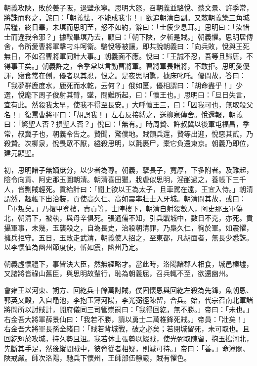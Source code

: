 \begin{pinyinscope}
 朝義攻陜，敗於姜子阪，退壁永寧。思明大怒，召朝義並駱悅、蔡文景、許季常，將誅而釋之，詫曰：「朝義怯，不能成我事！」欲追朝清自副。又敕朝義築三角城居糧，終日畢，未塓而思明至，怒不如約，辭曰：「士疲少息耳。」思明曰：「汝惜士而違我令邪？」據鞍畢塓乃去，顧曰：「朝下陜，夕斬是賊。」朝義懼。思明居傳舍，令所愛曹將軍擊刁斗呵衛。駱悅等被讓，即共說朝義曰：「向兵敗，悅與王死無日，不如召曹將軍同計大事。」朝義面不應。悅曰：「王誠不忍，吾等且歸唐，不得事王矣。」朝義許之，令季常以言動曹將軍。曹將軍畏諸將，不敢拒。思明愛優諢，寢食常在側，優者以其忍，恨之。是夜思明驚，據床叱吒。優問故，答曰：「我夢群鹿度水，鹿死而水乾，云何？」俄如匽，優相謂曰：「胡命盡乎！」少選，悅麾下周子俊射其臂，墜，問難所起，曰：「懷王也。」思明曰：「旦日失言，宜有此。然殺我太早，使我不得至長安。」大呼懷王三，曰：「囚我可也，無取殺父名！」復罵曹將軍曰：「胡誤我！」左右反接縛之，送柳泉傳舍。悅還報，朝義曰：「驚聖人否？損聖人否？」悅曰：「無有。」時周贄、許叔冀以後軍屯福昌，季常，叔冀子也，朝義令告之。贄聞，驚僕地。賊領兵還，贄等出迎，悅惡其貳，乃殺贄。次柳泉，悅畏眾不厭，縊殺思明，以氈裹尸，橐它負還東京。朝義乃即位，建元顯聖。



 初，思明諸子無嫡庶分，以少者為尊。朝義，孽長子，寬厚，下多附者。及難起，陰令向貢、阿史那玉圖朝清。朝清喜田獵，戕虐似思明，淫酗過之，養帳下三千人，皆剽賊輕死。貢紿計曰：「聞上欲以王為太子，且車駕在遠，王宜入侍。」朝清謂然，趣帳下出治裝，貢使高久仁、高如震率壯士入牙城。朝清問其故，或曰：「軍叛矣。」乃擐甲登樓，責貢等，士陣樓下，朝清自射殺數人，阿史那玉軍偽北，朝清下，被執，與母辛俱死。張通儒不知，引兵戰城中，數日不克，亦死。貢攝軍事，未幾，玉襲殺之，自為長史，治殺朝清罪，乃梟久仁，徇於軍。如震懼，擁兵拒守。五日，玉敗走武清，朝義使人招之，至東都，凡胡面者，無長少悉誅。以李懷仙為幽州節度使，斬如震，幽州乃定。



 朝義虛懷禮下，事皆決大臣，然無經略才。當此時，洛陽諸郡人相食，城邑榛墟，又諸將皆祿山舊臣，與思明故輩行，恥為朝義屈，召兵輒不至，欲還幽州。



 會雍王以河東、朔方、回紇兵十餘萬討賊，僕固懷恩與回紇左殺為先鋒，魚朝恩、郭英乂殿，入自黽池，李抱玉薄河陽，李光弼徑陳留，合兵。始，代宗召南北軍諸將問所以討賊計，開府儀同三司管崇嗣曰：「我得回紇，無不勝。」帝曰：「未也。」右金吾大將軍薛景仙曰：「我若不勝，請以勇士二萬椎鋒死賊。」帝員：「壯矣！」右金吾大將軍長孫全緒曰：「賊若背城戰，破之必矣；若閉城留死，未可取也。且回紇短於攻城，持久勢且沮。我若休士張勢以綴賊，使光弼取陳留，抱玉搗河北，先斷其手足，然後縱間賊中，彼脅從者相疑，則滅可待。」帝曰：「善。」命潼關、陜戒嚴。師次洛陽，馳兵下懷州，王師部伍靜嚴，賊有懼色。




\end{pinyinscope}
